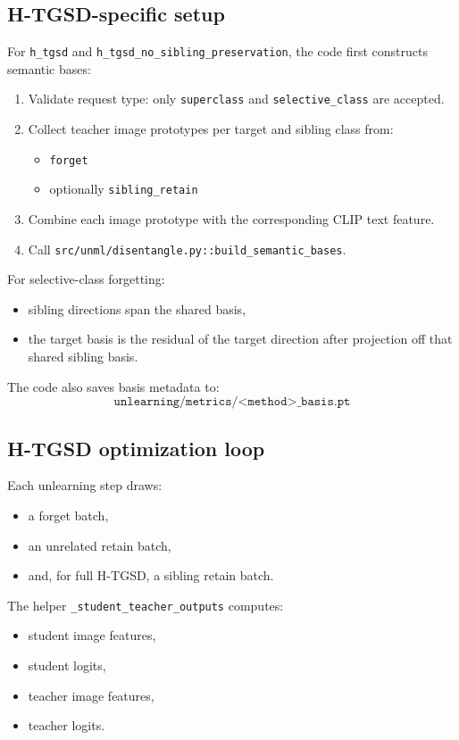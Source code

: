 \documentclass[10pt,a4paper]{article}
\begin{document}
\subsection{H-TGSD-specific setup}
For \texttt{h\_tgsd} and \texttt{h\_tgsd\_no\_sibling\_preservation}, the code first constructs semantic bases:
\begin{enumerate}
  \item Validate request type: only \texttt{superclass} and \texttt{selective\_class} are accepted.
  \item Collect teacher image prototypes per target and sibling class from:
  \begin{itemize}
    \item \texttt{forget}
    \item optionally \texttt{sibling\_retain}
  \end{itemize}
  \item Combine each image prototype with the corresponding CLIP text feature.
  \item Call \texttt{src/unml/disentangle.py::build\_semantic\_bases}.
\end{enumerate}

For selective-class forgetting:
\begin{itemize}
  \item sibling directions span the shared basis,
  \item the target basis is the residual of the target direction after projection off that shared sibling basis.
\end{itemize}

The code also saves basis metadata to:
\[
\texttt{unlearning/metrics/<method>\_basis.pt}
\]

\subsection{H-TGSD optimization loop}
Each unlearning step draws:
\begin{itemize}
  \item a forget batch,
  \item an unrelated retain batch,
  \item and, for full H-TGSD, a sibling retain batch.
\end{itemize}

The helper \texttt{\_student\_teacher\_outputs} computes:
\begin{itemize}
  \item student image features,
  \item student logits,
  \item teacher image features,
  \item teacher logits.
\end{itemize}
\end{document}
